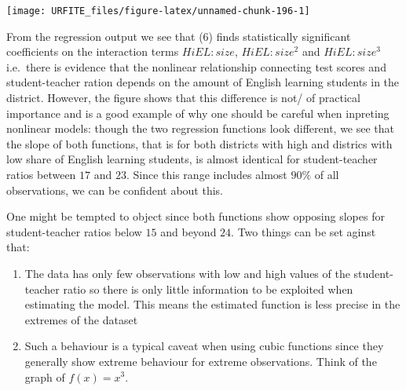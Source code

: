 \documentclass[]{book}
\newenvironment{Shaded}{\begin{snugshade}}{\end{snugshade}}
\newcommand{\KeywordTok}[1]{\textcolor[rgb]{0.13,0.29,0.53}{\textbf{#1}}}
\newcommand{\DataTypeTok}[1]{\textcolor[rgb]{0.13,0.29,0.53}{#1}}
\newcommand{\DecValTok}[1]{\textcolor[rgb]{0.00,0.00,0.81}{#1}}
\newcommand{\FloatTok}[1]{\textcolor[rgb]{0.00,0.00,0.81}{#1}}
\newcommand{\StringTok}[1]{\textcolor[rgb]{0.31,0.60,0.02}{#1}}
\newcommand{\CommentTok}[1]{\textcolor[rgb]{0.56,0.35,0.01}{\textit{#1}}}
\newcommand{\OperatorTok}[1]{\textcolor[rgb]{0.81,0.36,0.00}{\textbf{#1}}}
\newcommand{\NormalTok}[1]{#1}
\theoremstyle{definition}
\theoremstyle{definition}
\theoremstyle{definition}
\theoremstyle{remark}
\begin{document}
\begin{Shaded}
\end{Shaded}

\begin{center}\texttt{[image: URFITE\_files/figure-latex/unnamed-chunk-196-1]} \end{center}

From the regression output we see that (6) finds statistically
significant coefficients on the interaction terms \(HiEL:size\),
\(HiEL:size^2\) and \(HiEL:size^3\) i.e.~there is evidence that the
nonlinear relationship connecting test scores and student-teacher ration
depends on the amount of English learning students in the district.
However, the figure shows that this difference is not/ of practical
importance and is a good example of why one should be careful when
inpreting nonlinear models: though the two regression functions look
different, we see that the slope of both functions, that is for both
districts with high and districs with low share of English learning
students, is almost identical for student-teacher ratios between \(17\)
and \(23\). Since this range includes almost \(90\%\) of all
observations, we can be confident about this.

One might be tempted to object since both functions show opposing slopes
for student-teacher ratios below \(15\) and beyond \(24\). Two things
can be set aginst that:

\begin{enumerate}
\def\labelenumi{\arabic{enumi}.}
\item
  The data has only few observations with low and high values of the
  student-teacher ratio so there is only little information to be
  exploited when estimating the model. This means the estimated function
  is less precise in the extremes of the dataset
\item
  Such a behaviour is a typical caveat when using cubic functions since
  they generally show extreme behaviour for extreme observations. Think
  of the graph of \(f(x) = x^3\).
\end{enumerate}
\end{document}

